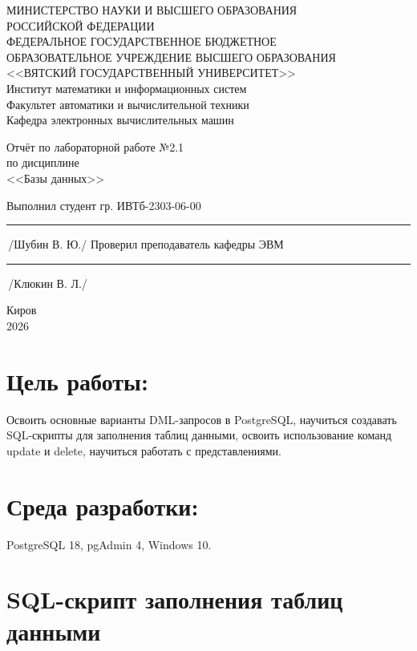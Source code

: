 \documentclass[oneside,a4paper,14pt]{extarticle}
\begin{document}
	\newpage\thispagestyle{empty}
	\begin{center}
		МИНИСТЕРСТВО НАУКИ И ВЫСШЕГО ОБРАЗОВАНИЯ\\
		РОССИЙСКОЙ ФЕДЕРАЦИИ\\
		ФЕДЕРАЛЬНОЕ ГОСУДАРСТВЕННОЕ БЮДЖЕТНОЕ\\
		ОБРАЗОВАТЕЛЬНОЕ УЧРЕЖДЕНИЕ ВЫСШЕГО ОБРАЗОВАНИЯ\\
		<<ВЯТСКИЙ ГОСУДАРСТВЕННЫЙ УНИВЕРСИТЕТ>>\\
		Институт математики и информационных систем\\
		Факультет автоматики и вычислительной техники\\
		Кафедра электронных вычислительных машин
	\end{center}
	\vspace{20mm}
	\begin{center}
		Отчёт по лабораторной работе №2.1\\
		по дисциплине\\
		<<Базы данных>>\\
	\end{center}
	\vspace{48mm}
	\noindent
	Выполнил студент гр. ИВТб-2303-06-00 \hfill \rule[-0,5mm]{30mm}{0.15mm}\,/Шубин В. Ю./
	\newline
	Проверил преподаватель кафедры ЭВМ \hfill \rule[-0,5mm]{30mm}{0.15mm}\,/Клюкин В. Л./
	\vfill
	\begin{center}
		Киров\\
		2026
	\end{center}
	\newpage
	\thispagestyle{empty}
	\section*{Цель работы:} Освоить основные варианты DML-запросов в PostgreSQL, научиться создавать SQL-скрипты для заполнения таблиц данными, освоить использование команд update и delete, научиться работать с представлениями.
	
	\section*{Среда разработки:} PostgreSQL 18, pgAdmin 4, Windows 10.
	
	\newpage
	
	\section*{SQL-скрипт заполнения таблиц данными}
	
\end{document}
